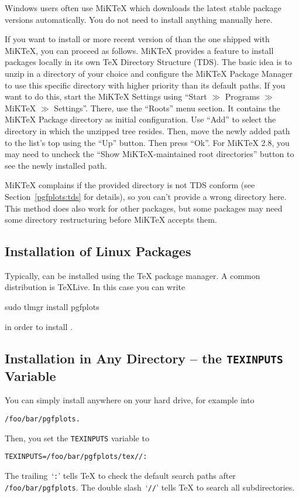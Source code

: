 Windows users often use MiK\TeX{} which downloads the latest stable package
versions automatically. You do not need to install anything manually here.

If you want to install or more recent version of \PGFPlots{} than the one
shipped with MiK\TeX{}, you can proceed as follows. MiK\TeX{} provides a
feature to install packages locally in its own \TeX{} Directory Structure
(TDS). The basic idea is to unzip \PGFPlots{} in a directory of your choice and
configure the MiK\TeX{} Package Manager to use this specific directory with
higher priority than its default paths. If you want to do this, start the
MiK\TeX{} Settings using ``Start $\gg$ Programs $\gg$ MiK\TeX{} $\gg$
Settings''. There, use the ``Roots'' menu section. It contains the MiK\TeX{}
Package directory as initial configuration. Use ``Add'' to select the directory
in which the unzipped \PGFPlots{} tree resides. Then, move the newly added path
to the list's top using the ``Up'' button. Then press ``Ok''. For MiK\TeX{}
2.8, you may need to uncheck the ``Show MiK\TeX{}-maintained root directories''
button to see the newly installed path.

MiK\TeX{} complains if the provided directory is not TDS conform (see
Section~\ref{pgfplots:tds} for details), so you can't provide a wrong directory
here. This method does also work for other packages, but some packages may need
some directory restructuring before MiK\TeX{} accepts them.


\subsection{Installation of Linux Packages}

Typically, \PGFPlots{} can be installed using the \TeX{} package manager. A
common distribution is \TeX{}Live. In this case you can write
%
\begin{codeexample}
sudo tlmgr install pgfplots
\end{codeexample}
%
\noindent in order to install \PGFPlots{}.


\subsection{Installation in Any Directory -- the \texttt{TEXINPUTS} Variable}

You can simply install \PGFPlots{} anywhere on your hard drive, for example
into
%
\begin{verbatim}
/foo/bar/pgfplots.
\end{verbatim}
%
Then, you set the \texttt{TEXINPUTS} variable to
%
\begin{verbatim}
TEXINPUTS=/foo/bar/pgfplots/tex//:
\end{verbatim}
%
The trailing~`\texttt{:}' tells \TeX{} to check the default search paths after
\lstinline!/foo/bar/pgfplots!. The double slash~`\texttt{//}' tells \TeX{} to
search all subdirectories.

